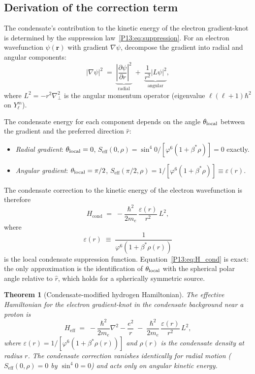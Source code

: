 \documentclass[11pt,a4paper]{article}
\newtheorem{theorem}{Theorem}[section]
\theoremstyle{definition}
\theoremstyle{remark}
\newcommand{\vp}{\varphi}
\newcommand{\bst}{\beta^{*}}
\newcommand{\Hcond}{H_{\mathrm{cond}}}
\newcommand{\Heff}{H_{\mathrm{eff}}}
\newcommand{\Seff}{S_{\mathrm{eff}}}
\newcommand{\epsr}{\varepsilon(r)}
\begin{document}
\subsection{Derivation of the correction term}

The condensate's contribution to the kinetic energy of the electron
gradient-knot is determined by the suppression law~\eqref{P13:eq:suppression}.
For an electron wavefunction $\psi(\mathbf{r})$ with gradient
$\nabla\psi$, decompose the gradient into radial and angular components:
\begin{equation}
  |\nabla\psi|^2
  \;=\; \underbrace{\left|\frac{\partial\psi}{\partial r}\right|^2}_{\text{radial}}
  \;+\; \underbrace{\frac{1}{r^2}|L\psi|^2}_{\text{angular}},
  \label{P13:eq:gradient_decomp}
\end{equation}
where $L^2 = -r^2\nabla_\perp^2$ is the angular momentum operator
(eigenvalue $\ell(\ell+1)\hbar^2$ on $Y_\ell^m$).

The condensate energy for each component depends on the angle
$\theta_{\rm local}$ between the gradient and the preferred direction $\hat{r}$:
\begin{itemize}[noitemsep]
  \item \emph{Radial gradient}: $\theta_{\rm local}=0$,
    $\Seff(0,\rho) = \sin^4\!0/[\vp^6(1+\bst\rho)] = 0$ exactly.
  \item \emph{Angular gradient}: $\theta_{\rm local}=\pi/2$,
    $\Seff(\pi/2,\rho) = 1/[\vp^6(1+\bst\rho)] \equiv \epsr$.
\end{itemize}
The condensate correction to the kinetic energy of the electron
wavefunction is therefore
\begin{equation}
  \Hcond
  \;=\; -\frac{\hbar^2}{2m_e}
        \,\frac{\epsr}{r^2}\,L^2,
  \label{P13:eq:H_cond}
\end{equation}
where
\begin{equation}
  \boxed{\epsr
  \;\equiv\; \frac{1}{\vp^6(1+\bst\rho(r))}}
  \label{P13:eq:epsilon_def}
\end{equation}
is the local condensate suppression function.
Equation~\eqref{P13:eq:H_cond} is exact: the only approximation is the
identification of $\theta_{\rm local}$ with the spherical polar angle
relative to $\hat{r}$, which holds for a spherically symmetric source.

\begin{theorem}[Condensate-modified hydrogen Hamiltonian]
\label{P13:thm:modified_H}
The effective Hamiltonian for the electron gradient-knot in the
condensate background near a proton is
\begin{equation}
  \boxed{
  \Heff
  \;=\; -\frac{\hbar^2}{2m_e}\nabla^2 - \frac{e^2}{r}
  \;-\; \frac{\hbar^2}{2m_e}\,\frac{\epsr}{r^2}\,L^2,
  }
  \label{P13:eq:H_eff}
\end{equation}
where $\epsr = 1/[\vp^6(1+\bst\rho(r))]$ and $\rho(r)$ is the
condensate density at radius $r$.
The condensate correction vanishes identically for radial motion
($\Seff(0,\rho)=0$ by $\sin^4\!0=0$) and acts only on angular
kinetic energy.
\end{theorem}
\end{document}
